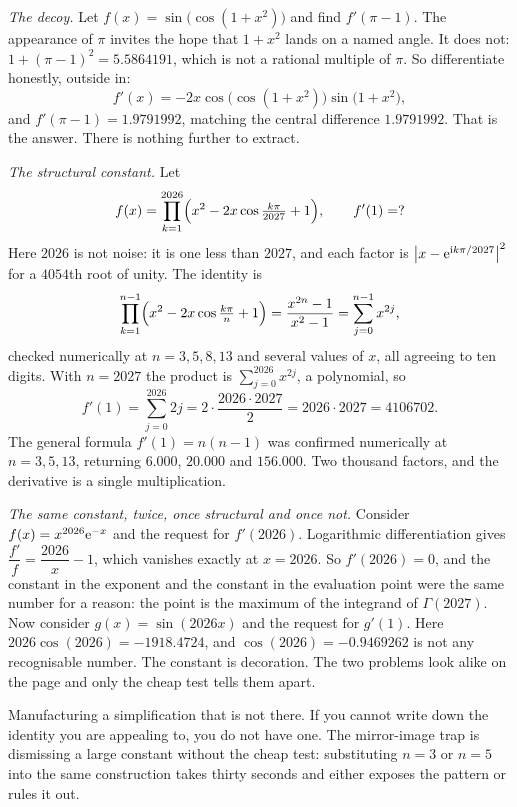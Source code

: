 \begin{worked}
\emph{The decoy.} Let $f(x)=\sin\bigl(\cos(1+x^{2})\bigr)$ and find $f'(\pi-1)$. The appearance of $\pi$ invites the hope that $1+x^{2}$ lands on a named angle. It does not: $1+(\pi-1)^{2}=5.5864191$, which is not a rational multiple of $\pi$. So differentiate honestly, outside in:
\[
f'(x)=-2x\cos\bigl(\cos(1+x^{2})\bigr)\sin\bigl(1+x^{2}\bigr),
\]
and $f'(\pi-1)=1.9791992$, matching the central difference $1.9791992$. That is the answer. There is nothing further to extract.

\emph{The structural constant.} Let
\[
f(x)=\prod_{k=1}^{2026}\Bigl(x^{2}-2x\cos\tfrac{k\pi}{2027}+1\Bigr),\qquad f'(1)=?
\]
Here $2026$ is not noise: it is one less than $2027$, and each factor is $\left\lvert x-\mathrm{e}^{\mathrm{i} k\pi/2027}\right\rvert^{2}$ for a $4054$th root of unity. The identity is
\[
\prod_{k=1}^{n-1}\Bigl(x^{2}-2x\cos\tfrac{k\pi}{n}+1\Bigr)=\frac{x^{2n}-1}{x^{2}-1}=\sum_{j=0}^{n-1}x^{2j},
\]
checked numerically at $n=3,5,8,13$ and several values of $x$, all agreeing to ten digits. With $n=2027$ the product is $\sum_{j=0}^{2026}x^{2j}$, a polynomial, so
\[
f'(1)=\sum_{j=0}^{2026}2j=2\cdot\frac{2026\cdot2027}{2}=2026\cdot2027=4106702 .
\]
The general formula $f'(1)=n(n-1)$ was confirmed numerically at $n=3,5,13$, returning $6.000$, $20.000$ and $156.000$. Two thousand factors, and the derivative is a single multiplication.

\emph{The same constant, twice, once structural and once not.} Consider $f(x)=x^{2026}\mathrm{e}^{-x}$ and the request for $f'(2026)$. Logarithmic differentiation gives $\dfrac{f'}{f}=\dfrac{2026}{x}-1$, which vanishes exactly at $x=2026$. So $f'(2026)=0$, and the constant in the exponent and the constant in the evaluation point were the same number for a reason: the point is the maximum of the integrand of $\Gamma(2027)$. Now consider $g(x)=\sin(2026x)$ and the request for $g'(1)$. Here $2026\cos(2026)=-1918.4724$, and $\cos(2026)=-0.9469262$ is not any recognisable number. The constant is decoration. The two problems look alike on the page and only the cheap test tells them apart.
\end{worked}

\begin{trap}
Manufacturing a simplification that is not there. If you cannot write down the identity you are appealing to, you do not have one. The mirror-image trap is dismissing a large constant without the cheap test: substituting $n=3$ or $n=5$ into the same construction takes thirty seconds and either exposes the pattern or rules it out.
\end{trap}

